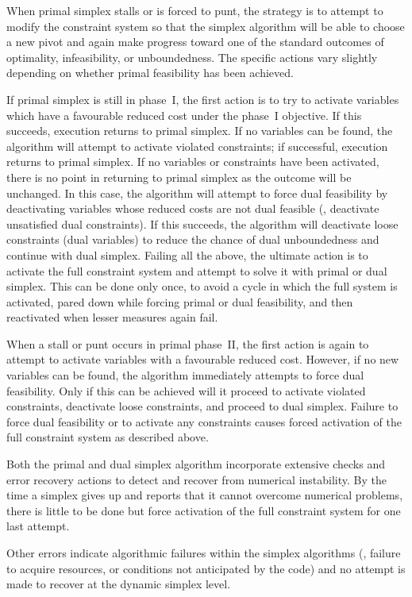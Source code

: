 When primal simplex stalls or is forced to punt, the strategy is to attempt to
modify the constraint system so that the simplex algorithm will be able to
choose a new pivot and again make progress toward one of the standard outcomes
of optimality, infeasibility, or unboundedness.
The specific actions vary slightly depending on whether primal feasibility has
been achieved.

If primal simplex is still in phase~I, the first action is to try to activate
variables which have a favourable reduced cost under the phase~I objective.
If this succeeds, execution returns to primal simplex.
If no variables can be found, the algorithm will attempt to activate violated
constraints; if successful, execution returns to primal simplex.
If no variables or constraints have been activated, there is no point in
returning to primal simplex as the outcome will be unchanged.
In this case, the algorithm will attempt to force dual feasibility by
deactivating variables whose reduced costs are not dual feasible (\ie,
deactivate unsatisfied dual constraints).
If this succeeds, the algorithm will deactivate loose constraints (dual
variables) to reduce the chance of dual unboundedness and continue with dual
simplex.
Failing all the above, the ultimate action is to activate the full constraint
system and attempt to solve it with primal or dual simplex.
This can be done only once, to avoid a cycle in which the full system is
activated, pared down while forcing primal or dual feasibility, and then
reactivated when lesser measures again fail.

When a stall or punt occurs in primal phase~II, the first action is again to
attempt to activate variables with a favourable reduced cost.
However, if no new variables can be found, the algorithm immediately attempts
to force dual feasibility.
Only if this can be achieved will it proceed to activate violated constraints,
deactivate loose constraints, and proceed to dual simplex.
Failure to force dual feasibility or to activate any constraints causes forced
activation of the full constraint system as described above.

Both the primal and dual simplex algorithm incorporate extensive checks and
error recovery actions to detect and recover from numerical instability.
By the time a simplex gives up and reports that it cannot overcome numerical
problems, there is little to be done but force activation of the full
constraint system for one last attempt.

Other errors indicate algorithmic failures within the simplex algorithms (\eg,
failure to acquire resources, or conditions not anticipated by the code)
and no attempt is made to recover at the dynamic simplex level.

